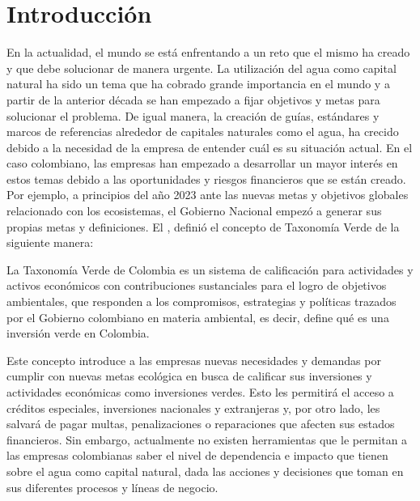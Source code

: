 \section{Introducción}
\label{sec:introduccion}
En la actualidad, el mundo se está enfrentando a un reto que el mismo ha creado y que debe solucionar de manera urgente. La utilización del agua como capital natural ha sido un tema que ha cobrado grande importancia en el mundo y a partir de la anterior década se han empezado a fijar objetivos y metas para solucionar el problema. De igual manera, la creación de guías, estándares y marcos de referencias alrededor de capitales naturales como el agua, ha crecido debido a la necesidad de la empresa de entender cuál es su situación actual. En el caso colombiano, las empresas han empezado a desarrollar un mayor interés en estos temas debido a las oportunidades y riesgos financieros que se están creado.  Por ejemplo, a principios del año 2023 ante las nuevas metas y objetivos globales relacionado con los ecosistemas, el Gobierno Nacional empezó a generar sus propias metas y definiciones. El \textcite{ministerio-de-hacienda-2023}, definió el concepto de Taxonomía Verde de la siguiente manera:

\hfill
\par
\leftskip=0.35in \rightskip=0.35in
La Taxonomía Verde de Colombia es un sistema de calificación para actividades y activos económicos con contribuciones sustanciales para el logro de objetivos ambientales, que responden a los compromisos, estrategias y políticas trazados por el Gobierno colombiano en materia ambiental, es decir, define qué es una inversión verde en Colombia.

\hfill
\par
\leftskip=0in \rightskip=0in
Este concepto introduce a las empresas nuevas necesidades y demandas por cumplir con nuevas metas ecológica en busca de calificar sus inversiones y actividades económicas como inversiones verdes. Esto les permitirá el acceso a créditos especiales, inversiones nacionales y extranjeras y, por otro lado, les salvará de pagar multas, penalizaciones o reparaciones que afecten sus estados financieros. Sin embargo, actualmente no existen herramientas que le permitan a las empresas colombianas saber el nivel de dependencia e impacto que tienen sobre el agua como capital natural, dada las acciones y decisiones que toman en sus diferentes procesos y líneas de negocio.

\hfill


